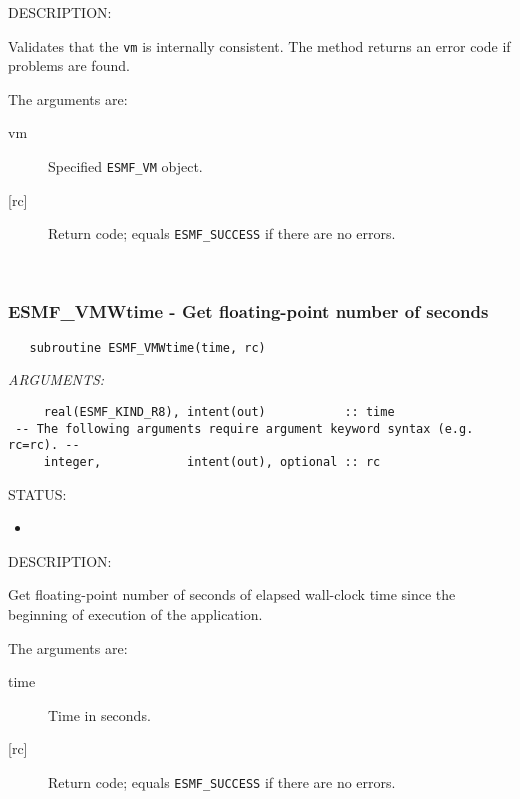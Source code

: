 {\sf DESCRIPTION:\\ }


        Validates that the {\tt vm} is internally consistent.
        The method returns an error code if problems are found.  
  
       The arguments are:
       \begin{description}
       \item[vm] 
            Specified {\tt ESMF\_VM} object.
       \item[{[rc]}] 
            Return code; equals {\tt ESMF\_SUCCESS} if there are no errors.
       \end{description}
   
 
\mbox{}\hrulefill\ 
 
\subsubsection [ESMF\_VMWtime] {ESMF\_VMWtime - Get floating-point number of seconds}


 
\begin{verbatim}   subroutine ESMF_VMWtime(time, rc)\end{verbatim}{\em ARGUMENTS:}
\begin{verbatim}     real(ESMF_KIND_R8), intent(out)           :: time
 -- The following arguments require argument keyword syntax (e.g. rc=rc). --
     integer,            intent(out), optional :: rc\end{verbatim}
{\sf STATUS:}
   \begin{itemize}
   \item{}
   \end{itemize}
  
{\sf DESCRIPTION:\\ }


     Get floating-point number of seconds of elapsed wall-clock time since the
     beginning of execution of the application.
  
     The arguments are:
     \begin{description}
     \item[time] 
          Time in seconds.
     \item[{[rc]}] 
          Return code; equals {\tt ESMF\_SUCCESS} if there are no errors.
     \end{description}
   
